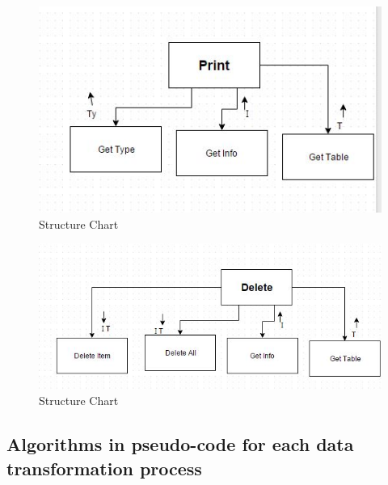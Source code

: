 \begin{figure}[H]
    \includegraphics[width=\textwidth]{HChart7.JPG}
    \caption{Structure Chart} \label{fig:StructureChart}
\end{figure}

\begin{figure}[H]
    \includegraphics[width=\textwidth]{HChart8.JPG}
    \caption{Structure Chart} \label{fig:StructureChart}
\end{figure}




\subsection{Algorithms in pseudo-code for each data transformation process}

